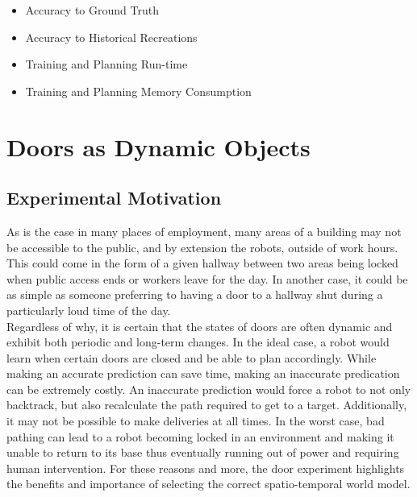   \begin{itemize}

    \item Accuracy to Ground Truth

    \item Accuracy to Historical Recreations

    \item Training and Planning Run-time

    \item Training and Planning Memory Consumption

  \end{itemize}

  \section{ Doors as Dynamic Objects }

  \subsection{ Experimental Motivation }

  As is the case in many places of employment, many areas of a building may not
  be accessible to the public, and by extension the robots, outside of work
  hours. This could come in the form of a given hallway between two areas being
  locked when public access ends or workers leave for the day. In another case, it could be as
  simple as someone preferring to having a door to a hallway shut during a
  particularly loud time of the day. \\

  Regardless of why, it is certain that the states of doors are often
  dynamic and exhibit both periodic and long-term changes. In the ideal case, a robot
  would learn when certain doors are closed and be able to plan accordingly.
  While making an accurate prediction can save time, making an inaccurate
  predication can be extremely costly. An inaccurate prediction would force a robot
  to not only backtrack, but also recalculate the path required to get to a
  target. Additionally, it may not be possible to make deliveries at all times.
  In the worst case, bad pathing can lead to a robot becoming locked in an
  environment and making it unable to return to its base thus eventually running out of power and
  requiring human intervention. For these reasons and more, the door
  experiment highlights the benefits and importance of selecting the correct spatio-temporal world
  model. \\


